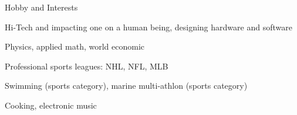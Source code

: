 \documentclass{template}
\begin{document}

\begin{rSection}{Hobby and Interests}
\begin{rHobby}

\item Hi-Tech and impacting one on a human being, designing hardware and software
\item Physics, applied math, world economic
\item Professional sports leagues: NHL, NFL, MLB
\item Swimming (sports category), marine multi-athlon (sports category)
\item Cooking, electronic music

\end{rHobby}
\end{rSection}
\end{document}
